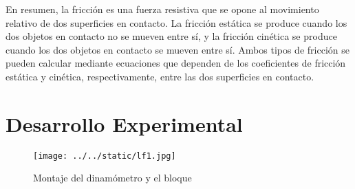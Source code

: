 \documentclass{article}
\begin{document}
\begin{multicols}{2}
En resumen, la fricción es una fuerza resistiva que se opone al movimiento relativo de dos superficies en contacto. La fricción estática se produce cuando los dos objetos en contacto no se mueven entre sí, y la fricción cinética se produce cuando los dos objetos en contacto se mueven entre sí. Ambos tipos de fricción se pueden calcular mediante ecuaciones que dependen de los coeficientes de fricción estática y cinética, respectivamente, entre las dos superficies en contacto.

\section{Desarrollo Experimental}\label{Desarrollo experimental}				%
	\begin{figure}[H]
		\centering
		\texttt{[image: ../../static/lf1.jpg]}	
		\caption{Montaje del dinamómetro y el bloque}
		\label{fig:1}
	\end{figure}


\end{multicols}
\end{document}
